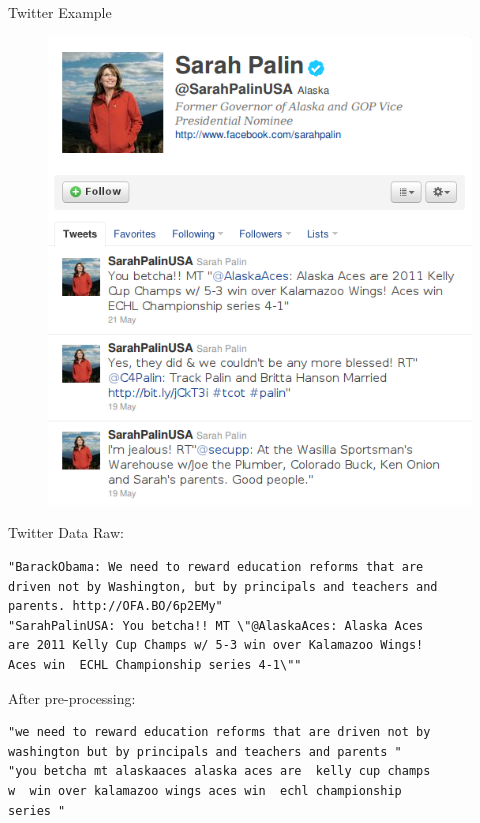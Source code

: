 \documentclass{beamer}
\begin{document}
\begin{frame}{Twitter Example}
\begin{figure}[!ht]
   \includegraphics[scale=.3]{pres4.png}
 \end{figure}
\end{frame}

\begin{frame}[fragile]{Twitter Data}
  Raw:
\begin{verbatim}
"BarackObama: We need to reward education reforms that are
driven not by Washington, but by principals and teachers and
parents. http://OFA.BO/6p2EMy"
"SarahPalinUSA: You betcha!! MT \"@AlaskaAces: Alaska Aces
are 2011 Kelly Cup Champs w/ 5-3 win over Kalamazoo Wings!
Aces win  ECHL Championship series 4-1\""
\end{verbatim}
  After pre-processing:
\begin{verbatim}
"we need to reward education reforms that are driven not by
washington but by principals and teachers and parents "
"you betcha mt alaskaaces alaska aces are  kelly cup champs
w  win over kalamazoo wings aces win  echl championship
series "
\end{verbatim}
\end{frame}
\end{document}
